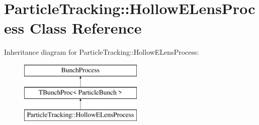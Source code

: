 \hypertarget{classParticleTracking_1_1HollowELensProcess}{}\section{Particle\+Tracking\+:\+:Hollow\+E\+Lens\+Process Class Reference}
\label{classParticleTracking_1_1HollowELensProcess}
Inheritance diagram for Particle\+Tracking\+:\+:Hollow\+E\+Lens\+Process\+:\begin{figure}[H]
\begin{center}
\leavevmode
\includegraphics[height=3.000000cm]{classParticleTracking_1_1HollowELensProcess}
\end{center}
\end{figure}
